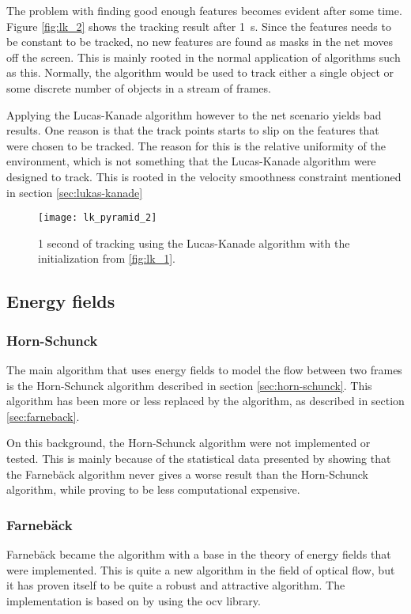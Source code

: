 The problem with finding good enough features becomes evident after some time. Figure \vref{fig:lk_2} shows the 
tracking result after \SI{1}{\second}. Since the features needs to be constant to be tracked, no new features are found as masks in the net moves 
off the screen. This is mainly rooted in the normal application of algorithms such as this. Normally, the algorithm would be used to track either a single object or 
some discrete number of objects in a stream of frames. 

Applying the Lucas-Kanade algorithm however to the net scenario yields bad results. One reason is that the track points starts to slip on the features 
that were chosen to be tracked. The reason for this is the relative uniformity of the environment, which is not something that the Lucas-Kanade algorithm 
were designed to track. This is rooted in the velocity smoothness constraint mentioned in section \ref{sec:lukas-kanade} 

\begin{figure}
	\centering
	\texttt{[image: lk\_pyramid\_2]}
	\caption{1 second of tracking using the Lucas-Kanade algorithm with the initialization from \ref{fig:lk_1}.}
	\label{fig:lk_2}
\end{figure}

\subsection{Energy fields}

\subsubsection{Horn-Schunck}
The main algorithm that uses energy fields to model the flow between two frames is the Horn-Schunck algorithm described in section \vref{sec:horn-schunck}. This 
algorithm has been more or less replaced by the \citet{farnebackSCIA03} algorithm, as described in section \vref{sec:farneback}. 

On this background, the Horn-Schunck 
algorithm were not implemented or tested. 
This is mainly because of the statistical data presented by \citet{farnebackSCIA03} showing that the 
Farnebäck algorithm never gives a worse result than the Horn-Schunck algorithm, while proving to be 
less computational expensive.

\clearpage

\subsubsection{Farnebäck}
Farnebäck became the algorithm with a base in the theory of energy fields that were implemented. This 
is quite a new algorithm in the field of optical flow, but it has proven itself to be 
quite a robust and attractive algorithm. The implementation is based on \citet{farnebackSCIA03} by 
using the \gls{ocv} library.

